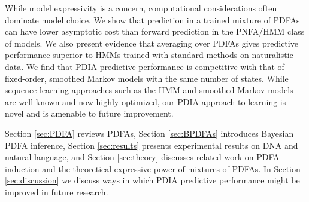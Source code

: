 While model expressivity is a concern, computational considerations often dominate model choice.  We show that prediction in a trained mixture of PDFAs can have lower asymptotic cost than forward prediction in the PNFA/HMM class of models.  We also present evidence that averaging over PDFAs gives predictive performance superior to HMMs trained with standard methods on naturalistic data.  We find that PDIA predictive performance is competitive with that of fixed-order, smoothed Markov models with the same number of states.  While sequence learning approaches such as the HMM and smoothed Markov models are well known and now highly optimized, our PDIA approach to learning is novel and is amenable to future improvement.  

Section \ref{sec:PDFA} reviews PDFAs, Section \ref{sec:BPDFAs} introduces Bayesian PDFA inference, Section \ref{sec:results} presents experimental results on DNA and natural language, and Section \ref{sec:theory} discusses related work on PDFA induction and the theoretical expressive power of mixtures of PDFAs.
In Section \ref{sec:discussion} we discuss ways in which PDIA predictive performance might be improved in future research.

